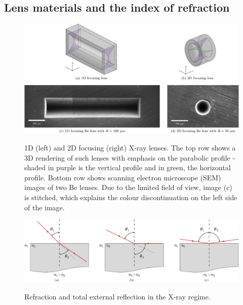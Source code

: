 \begin{refsection}
\subsection{Lens materials and the index of refraction}\label{sec:interaction_with_matter}
\begin{figure}[t]
    \centering
    {\includegraphics[width=.75\linewidth]{figures/ch03/1D2D.pdf}}
    \caption[1D and 2D focusing X-ray lenses]{1D (left) and 2D focusing (right) X-ray lenses. The top row shows a 3D rendering of such lenses with emphasis on the parabolic profile - shaded in purple is the vertical profile and in green, the horizontal profile. Bottom row shows scanning electron microscope (SEM) images of two Be lenses. Due to the limited field of view, image (c) is stitched, which explains the colour discontinuation on the left side of the image.} 
    \label{fig:1D2D_lenses}
\end{figure}
\begin{figure}[t]
    \centering
    {\includegraphics[width=0.75\linewidth]{figures/ch03/reflection_refraction.pdf}}
    \caption[Refraction and total external reflection in the X-ray regime]{Refraction and total external reflection in the X-ray regime.}
    \label{fig:reflection_refraction}
\end{figure}

\end{refsection}
